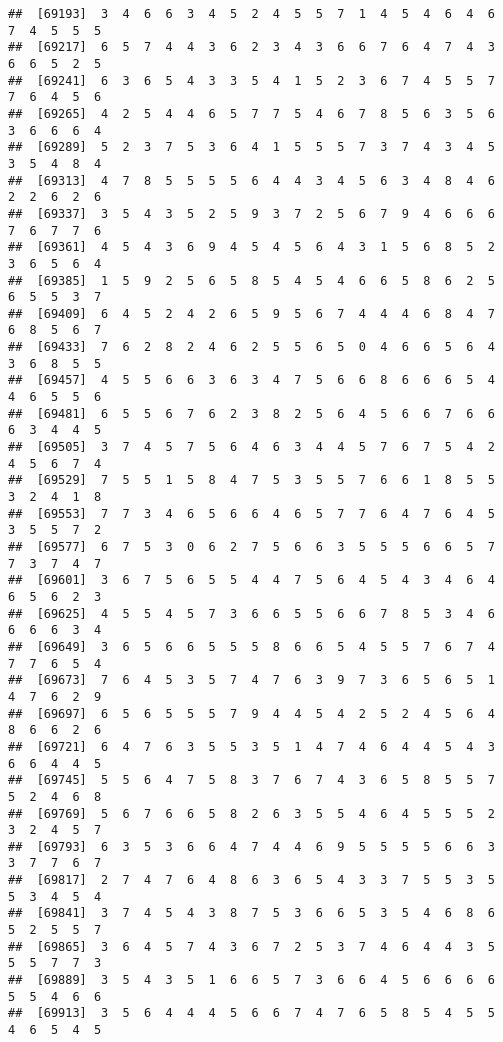 \documentclass[
]{book}
\begin{document}
\begin{verbatim}
##  [69193]  3  4  6  6  3  4  5  2  4  5  5  7  1  4  5  4  6  4  6  7  4  5  5  5
##  [69217]  6  5  7  4  4  3  6  2  3  4  3  6  6  7  6  4  7  4  3  6  6  5  2  5
##  [69241]  6  3  6  5  4  3  3  5  4  1  5  2  3  6  7  4  5  5  7  7  6  4  5  6
##  [69265]  4  2  5  4  4  6  5  7  7  5  4  6  7  8  5  6  3  5  6  3  6  6  6  4
##  [69289]  5  2  3  7  5  3  6  4  1  5  5  5  7  3  7  4  3  4  5  3  5  4  8  4
##  [69313]  4  7  8  5  5  5  5  6  4  4  3  4  5  6  3  4  8  4  6  2  2  6  2  6
##  [69337]  3  5  4  3  5  2  5  9  3  7  2  5  6  7  9  4  6  6  6  7  6  7  7  6
##  [69361]  4  5  4  3  6  9  4  5  4  5  6  4  3  1  5  6  8  5  2  3  6  5  6  4
##  [69385]  1  5  9  2  5  6  5  8  5  4  5  4  6  6  5  8  6  2  5  6  5  5  3  7
##  [69409]  6  4  5  2  4  2  6  5  9  5  6  7  4  4  4  6  8  4  7  6  8  5  6  7
##  [69433]  7  6  2  8  2  4  6  2  5  5  6  5  0  4  6  6  5  6  4  3  6  8  5  5
##  [69457]  4  5  5  6  6  3  6  3  4  7  5  6  6  8  6  6  6  5  4  4  6  5  5  6
##  [69481]  6  5  5  6  7  6  2  3  8  2  5  6  4  5  6  6  7  6  6  6  3  4  4  5
##  [69505]  3  7  4  5  7  5  6  4  6  3  4  4  5  7  6  7  5  4  2  4  5  6  7  4
##  [69529]  7  5  5  1  5  8  4  7  5  3  5  5  7  6  6  1  8  5  5  3  2  4  1  8
##  [69553]  7  7  3  4  6  5  6  6  4  6  5  7  7  6  4  7  6  4  5  3  5  5  7  2
##  [69577]  6  7  5  3  0  6  2  7  5  6  6  3  5  5  5  6  6  5  7  7  3  7  4  7
##  [69601]  3  6  7  5  6  5  5  4  4  7  5  6  4  5  4  3  4  6  4  6  5  6  2  3
##  [69625]  4  5  5  4  5  7  3  6  6  5  5  6  6  7  8  5  3  4  6  6  6  6  3  4
##  [69649]  3  6  5  6  6  5  5  5  8  6  6  5  4  5  5  7  6  7  4  7  7  6  5  4
##  [69673]  7  6  4  5  3  5  7  4  7  6  3  9  7  3  6  5  6  5  1  4  7  6  2  9
##  [69697]  6  5  6  5  5  5  7  9  4  4  5  4  2  5  2  4  5  6  4  8  6  6  2  6
##  [69721]  6  4  7  6  3  5  5  3  5  1  4  7  4  6  4  4  5  4  3  6  6  4  4  5
##  [69745]  5  5  6  4  7  5  8  3  7  6  7  4  3  6  5  8  5  5  7  5  2  4  6  8
##  [69769]  5  6  7  6  6  5  8  2  6  3  5  5  4  6  4  5  5  5  2  3  2  4  5  7
##  [69793]  6  3  5  3  6  6  4  7  4  4  6  9  5  5  5  5  6  6  3  3  7  7  6  7
##  [69817]  2  7  4  7  6  4  8  6  3  6  5  4  3  3  7  5  5  3  5  5  3  4  5  4
##  [69841]  3  7  4  5  4  3  8  7  5  3  6  6  5  3  5  4  6  8  6  5  2  5  5  7
##  [69865]  3  6  4  5  7  4  3  6  7  2  5  3  7  4  6  4  4  3  5  5  5  7  7  3
##  [69889]  3  5  4  3  5  1  6  6  5  7  3  6  6  4  5  6  6  6  6  5  5  4  6  6
##  [69913]  3  5  6  4  4  4  5  6  6  7  4  7  6  5  8  5  4  5  5  4  6  5  4  5

\end{verbatim}
\end{document}
